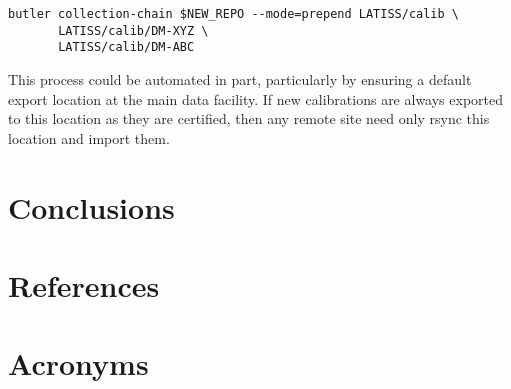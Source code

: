 \documentclass[DM,authoryear,toc]{lsstdoc}
\begin{document}
\begin{verbatim}
butler collection-chain $NEW_REPO --mode=prepend LATISS/calib \
       LATISS/calib/DM-XYZ \
       LATISS/calib/DM-ABC
\end{verbatim}

This process could be automated in part, particularly by ensuring a default export location at the main data facility.  If new calibrations are always exported to this location as they are certified, then any remote site need only rsync this location and import them.


\section{Conclusions}

\appendix
\section{References} \label{sec:bib}
\renewcommand{\refname}{} %


\section{Acronyms} \label{sec:acronyms}

\end{document}
